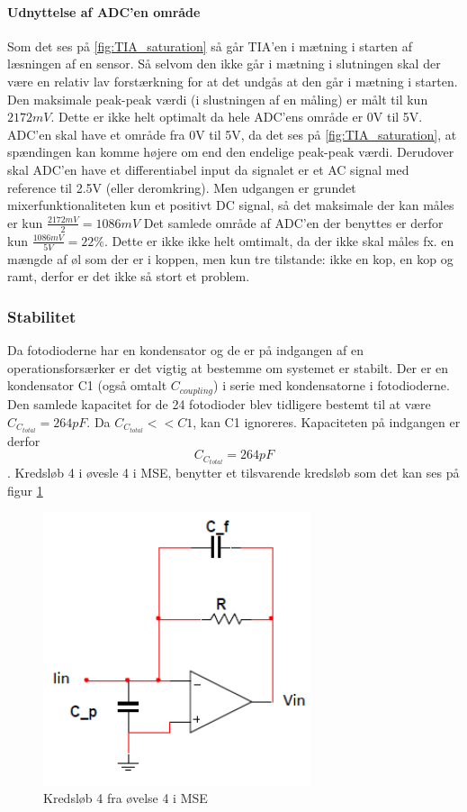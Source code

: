 \documentclass[HardwareDesign/HardwareDesign_main.tex]{subfiles}
\begin{document}
{\paragraph{Udnyttelse af ADC'en område}
Som det ses på \ref{fig:TIA_saturation} så går TIA'en i mætning i starten af læsningen af en sensor. Så selvom den ikke går i mætning i slutningen skal der være en relativ lav forstærkning for at det undgås at den går i mætning i starten. Den maksimale peak-peak værdi (i slustningen af en måling) er målt til kun $2172\si{mV}$. Dette er ikke helt optimalt da hele ADC'ens område er 0V til 5V. ADC'en skal have et område fra 0V til 5V, da det ses på \ref{fig:TIA_saturation}, at spændingen kan komme højere om end den endelige peak-peak værdi. Derudover skal ADC'en have et differentiabel input da signalet er et AC signal med reference til 2.5V (eller deromkring). Men udgangen er grundet mixerfunktionaliteten kun et positivt DC signal, så det maksimale der kan måles er kun $\frac{2172\si{mV}}{2} = 1086\si{mV}$ Det samlede område af ADC'en der benyttes er derfor kun $\frac{1086\si{mV}}{5\si{V}} = 22\%$. Dette er ikke ikke helt omtimalt, da der ikke skal måles fx. en mængde af øl som der er i koppen, men kun tre tilstande: ikke en kop, en kop og ramt, derfor er det ikke så stort et problem.
}

\subsubsection{Stabilitet}

Da fotodioderne har en kondensator og de er på indgangen af en operationsforsærker er det vigtig at bestemme om systemet er stabilt. Der er en kondensator C1 (også omtalt $C_{coupling}$) i serie med kondensatorne i fotodioderne. Den samlede kapacitet for de 24 fotodioder blev tidligere bestemt til at være $C_{C_{total}} = 264\si{pF}$. Da $C_{C_{total}} << C1$, kan C1 ignoreres. Kapaciteten på indgangen er derfor $$C_{C_{total}} = 264\si{pF}$$. 
Kredsløb 4 i øvesle 4 i MSE, benytter et tilsvarende kredsløb som det kan ses på figur \ref{fig:MSE_4_kreds_4}

\begin{figure}
    \centering
    \includegraphics[width=0.7\textwidth]{HardwareDesign/CupSensor/graphics/MSE_EXC_4_opg_4.png}
    \caption{Kredsløb 4 fra øvelse 4 i MSE}
    \label{fig:MSE_4_kreds_4}
\end{figure}
\end{document}
